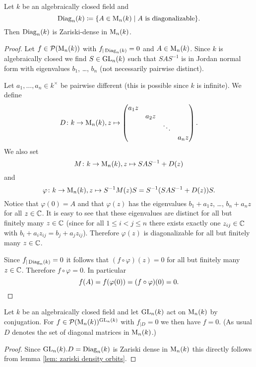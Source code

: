 \begin{prop}
 Let $k$ be an algebraically closed field and
 \[
  \operatorname{Diag}_n(k) \coloneqq \{A \in \operatorname{M}_n(k) \mid \text{$A$ is diagonalizable}\}.
 \]
 Then $\operatorname{Diag}_n(k)$ is Zariski-dense in $\operatorname{M}_n(k)$.
\end{prop}
\begin{proof}
 Let $f \in \mathcal{P}(\operatorname{M}_n(k))$ with $f_{|\operatorname{Diag}_n(k)} = 0$ and $A \in \operatorname{M}_n(k)$. Since $k$ is algebraically closed we find $S \in \operatorname{GL}_n(k)$ such that $SAS^{-1}$ is in Jordan normal form with eigenvalues $b_1$, \dots, $b_n$ (not necessarily pairwise distinct).
 
 Let $a_1, \dotsc, a_n \in k^\times$ be pairwise different (this is possible since $k$ is infinite). We define
 \[
  D \colon k \to \operatorname{M}_n(k), z \mapsto
  \begin{pmatrix}
   a_1 z &       &        &       \\
         & a_2 z &        &       \\
         &       & \ddots &       \\
         &       &        & a_n z
  \end{pmatrix}.
 \]
 We also set
 \[
  M \colon k \to \operatorname{M}_n(k), z \mapsto SAS^{-1} + D(z)
 \]
 and
 \[
  \varphi \colon k \to \operatorname{M}_n(k), z \mapsto S^{-1} M(z) S = S^{-1}(SAS^{-1}+D(z))S.
 \]
 Notice that $\varphi(0) = A$ and that $\varphi(z)$ has the eigenvalues $b_1 + a_1 z$, \dots, $b_n + a_n z$ for all $z \in \mathbb{C}$. It is easy to see that these eigenvalues are distinct for all but finitely many $z \in \mathbb{C}$ (since for all $1 \leq i < j \leq n$ there exists exactly one $z_{ij} \in \mathbb{C}$ with $b_i + a_i z_{ij} = b_j + a_j z_{ij}$). Therefore $\varphi(z)$ is diagonalizable for all but finitely many $z \in \mathbb{C}$.
 
 Since $f_{|\operatorname{Diag}_n(k)} = 0$ it follows that $(f \circ \varphi)(z) = 0$ for all but finitely many $z \in \mathbb{C}$. Therefore $f \circ \varphi = 0$. In particular
 \[
  f(A) = f(\varphi(0)) = (f \circ \varphi)(0) = 0.
  \qedhere
 \]
\end{proof}


\begin{cor}\label{cor: diagonal matrices dense alg closed}
 Let $k$ be an algebraically closed field and let $\operatorname{GL}_n(k)$ act on $\operatorname{M}_n(k)$ by conjugation. For $f \in \mathcal{P}(\operatorname{M}_n(k))^{\operatorname{GL}_n(k)}$ with $f_{|D} = 0$ we then have $f = 0$. (As usual $D$ denotes the set of diagonal matrices in $\operatorname{M}_n(k)$.)
\end{cor}
\begin{proof}
 Since $\operatorname{GL}_n(k).D = \operatorname{Diag}_n(k)$ is Zariski dense in $\operatorname{M}_n(k)$ this directly follows from lemma \ref{lem: zariski density orbits}.
\end{proof}



